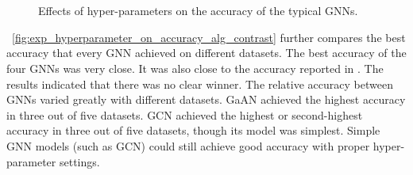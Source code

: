 \begin{figure}[H]
    \centering
    \\
    \\
    \caption{Effects of hyper-parameters on the accuracy of the typical GNNs.}
    \label{fig:exp_hyperparameter_accuracy}
\end{figure}

\figurename~\ref{fig:exp_hyperparameter_on_accuracy_alg_contrast} further compares the best accuracy that every GNN achieved on different datasets.
%
The best accuracy of the four GNNs was very close.
%
%
It was also close to the accuracy reported in \cite{shchur2018_pitfall_of_gnn, zeng2020_graphsaint}.
%
The results indicated that there was no clear winner.
%
The relative accuracy between GNNs varied greatly with different datasets.
%
GaAN achieved the highest accuracy in three out of five datasets.
%
GCN achieved the highest or second-highest accuracy in three out of five datasets, though its model was simplest.
%
Simple GNN models (such as GCN) could still achieve good accuracy with proper hyper-parameter settings.

